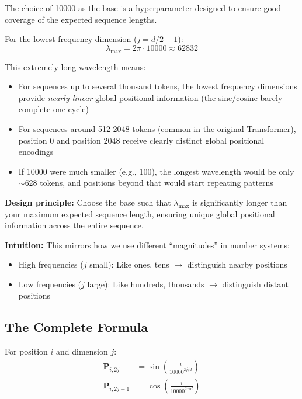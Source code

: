 \documentclass{article}
\begin{document}
\begin{tcolorbox}[colback=yellow!5!white, colframe=orange!50!black, title=The Magic Number: Why 10000?]
The choice of 10000 as the base is a hyperparameter designed to ensure good coverage of the expected sequence lengths.

For the lowest frequency dimension ($j = d/2 - 1$):
\[
\lambda_{\max} = 2\pi \cdot 10000 \approx 62832
\]

This extremely long wavelength means:
\begin{itemize}
\item For sequences up to several thousand tokens, the lowest frequency dimensions provide \textit{nearly linear} global positional information (the sine/cosine barely complete one cycle)
\item For sequences around 512-2048 tokens (common in the original Transformer), position 0 and position 2048 receive clearly distinct global positional encodings
\item If 10000 were much smaller (e.g., 100), the longest wavelength would be only $\sim$628 tokens, and positions beyond that would start repeating patterns
\end{itemize}

\textbf{Design principle:} Choose the base such that $\lambda_{\max}$ is significantly longer than your maximum expected sequence length, ensuring unique global positional information across the entire sequence.
\end{tcolorbox}

\textbf{Intuition:} This mirrors how we use different ``magnitudes'' in number systems:
\begin{itemize}
\item High frequencies ($j$ small): Like ones, tens $\rightarrow$ distinguish nearby positions
\item Low frequencies ($j$ large): Like hundreds, thousands $\rightarrow$ distinguish distant positions
\end{itemize}

\subsection{The Complete Formula}

For position $i$ and dimension $j$:
\begin{align}
\mathbf{P}_{i,2j} &= \sin\left(\frac{i}{10000^{2j/d}}\right) \\
\mathbf{P}_{i,2j+1} &= \cos\left(\frac{i}{10000^{2j/d}}\right)
\end{align}
\end{document}
